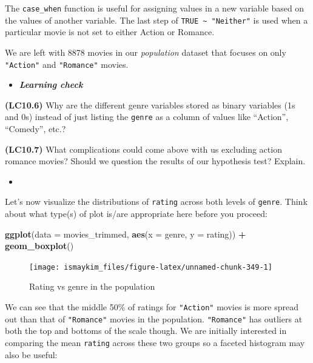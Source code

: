 \documentclass[12pt, krantz2,]{krantz}
\makeatletter
\newenvironment{Shaded}{\begin{snugshade}}{\end{snugshade}}
\newcommand{\DataTypeTok}[1]{\textcolor[rgb]{0.27,0.27,0.27}{#1}}
\newcommand{\KeywordTok}[1]{\textcolor[rgb]{0.27,0.27,0.27}{\textbf{#1}}}
\newcommand{\NormalTok}[1]{#1}
\newcommand{\OperatorTok}[1]{\textcolor[rgb]{0.43,0.43,0.43}{\textbf{#1}}}
\newcommand{\StringTok}[1]{\textcolor[rgb]{0.5,0.5,0.5}{#1}}
\newenvironment{kframe}{%
\medskip{}
\setlength{\fboxsep}{.8em}
 \def\at@end@of@kframe{}%
 \ifinner\ifhmode%
  \def\at@end@of@kframe{\end{minipage}}%
  \begin{minipage}{\columnwidth}%
 \fi\fi%
 \def\FrameCommand##1{\hskip\@totalleftmargin \hskip-\fboxsep
 \colorbox{shadecolor}{##1}\hskip-\fboxsep
     \hskip-\linewidth \hskip-\@totalleftmargin \hskip\columnwidth}%
 \MakeFramed {\advance\hsize-\width
   \@totalleftmargin\z@ \linewidth\hsize
   \@setminipage}}%
 {\par\unskip\endMakeFramed%
 \at@end@of@kframe}
\renewenvironment{Shaded}{\begin{kframe}}{\end{kframe}}
\newenvironment{rmdblock}[1]
  {\begin{shaded*}
  \begin{itemize}
  \renewcommand{\labelitemi}{
    \raisebox{-.7\height}[0pt][0pt]{
    }
  }
  \item
  }
  {
  \end{itemize}
  \end{shaded*}
  }
\newenvironment{learncheck}
  {\begin{rmdblock}{warning}}
  {\end{rmdblock}}
\makeatother
\begin{document}
The \texttt{case\_when} function is useful for assigning values in a new variable based on the values of another variable. The last step of \texttt{TRUE\ \textasciitilde{}\ "Neither"} is used when a particular movie is not set to either Action or Romance.

We are left with 8878 movies in our \emph{population} dataset that focuses on only \texttt{"Action"} and \texttt{"Romance"} movies.

\begin{learncheck}
\textbf{\emph{Learning check}}
\end{learncheck}

\textbf{(LC10.6)} Why are the different genre variables stored as binary variables (1s and 0s) instead of just listing the \texttt{genre} as a column of values like ``Action'', ``Comedy'', etc.?

\textbf{(LC10.7)} What complications could come above with us excluding action romance movies? Should we question the results of our hypothesis test? Explain.

\begin{learncheck}

\end{learncheck}

Let's now visualize the distributions of \texttt{rating} across both levels of \texttt{genre}. Think about what type(s) of plot is/are appropriate here before you proceed:

\begin{Shaded}
\begin{Highlighting}[]
\KeywordTok{ggplot}\NormalTok{(}\DataTypeTok{data =}\NormalTok{ movies_trimmed, }\KeywordTok{aes}\NormalTok{(}\DataTypeTok{x =}\NormalTok{ genre, }\DataTypeTok{y =}\NormalTok{ rating)) }\OperatorTok{+}
\StringTok{  }\KeywordTok{geom_boxplot}\NormalTok{()}
\end{Highlighting}
\end{Shaded}

\begin{figure}

{\centering \texttt{[image: ismaykim\_files/figure-latex/unnamed-chunk-349-1]} 

}

\caption{Rating vs genre in the population}\label{fig:unnamed-chunk-349}
\end{figure}

We can see that the middle 50\% of ratings for \texttt{"Action"} movies is more spread out than that of \texttt{"Romance"} movies in the population. \texttt{"Romance"} has outliers at both the top and bottoms of the scale though. We are initially interested in comparing the mean \texttt{rating} across these two groups so a faceted histogram may also be useful:
\end{document}
